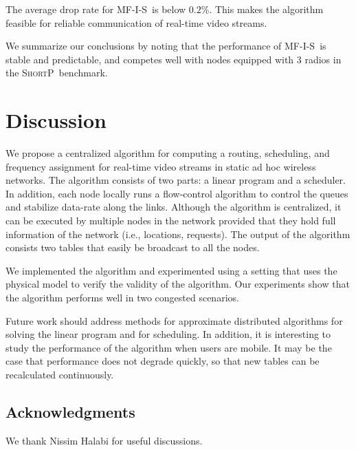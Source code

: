 \documentclass[12pt]{article}
\newenvironment{proof sketch}[1]{\noindent {\emph{Proof sketch of #1:}}}{\hfill \qed}
\newcommand{\algA}{\textsc{MF-I-S}}
\newcommand{\algB}{\textsc{ShortP}}
\newcommand{\algS}{\algB}
\begin{document}
The average drop rate for \algA\ is below $0.2$\%. This makes the algorithm
feasible for reliable communication of real-time video streams.

We summarize our conclusions by noting that the performance of \algA\
is stable and predictable, and competes well with nodes equipped with
$3$ radios in the \algS\ benchmark.

\section{Discussion}
We propose a centralized algorithm for computing a routing,
scheduling, and frequency assignment for real-time video streams in
static ad hoc wireless networks.  The algorithm consists of two parts:
a linear program and a scheduler.  In addition, each node locally runs
a flow-control algorithm to control the queues and stabilize data-rate
along the links.  Although the algorithm is centralized, it can be
executed by multiple nodes in the network provided that they hold full
information of the network (i.e., locations, requests).  The output of
the algorithm consists two tables that easily be broadcast to all the
nodes.

We implemented the algorithm and experimented using a setting that
uses the physical model to verify the validity of the algorithm.  Our
experiments show that the algorithm performs well in two congested
scenarios.  

Future work should address methods for approximate distributed
algorithms for solving the linear program and for scheduling. In
addition, it is interesting to study the performance of the algorithm
when users are mobile.  It may be the case that performance does not
degrade quickly, so that new tables can be recalculated continuously.


%
\ifnum{}
  \subsection*{Acknowledgments}
  We thank Nissim Halabi for useful discussions.
\fi
%



\end{document}
